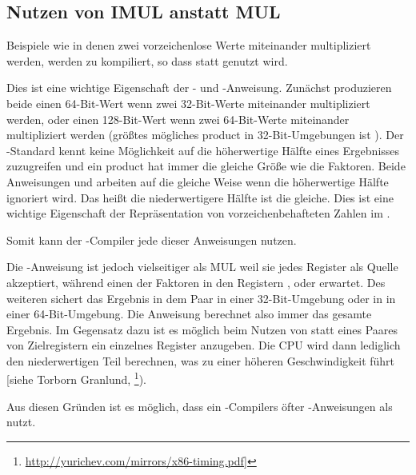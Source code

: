 \subsection{Nutzen von IMUL anstatt MUL}
\label{IMUL_over_MUL}

Beispiele wie  in denen zwei vorzeichenlose Werte miteinander multipliziert
werden, werden zu  kompiliert, so dass \IMUL statt \MUL genutzt wird.

Dies ist eine wichtige Eigenschaft der \MUL- und \IMUL-Anweisung.
Zunächst produzieren beide einen 64-Bit-Wert wenn zwei 32-Bit-Werte miteinander multipliziert werden,
oder einen 128-Bit-Wert wenn zwei 64-Bit-Werte miteinander multipliziert werden (größtes mögliches \gls{product}
in 32-Bit-Umgebungen ist ).
Der \CCpp-Standard kennt keine Möglichkeit auf die höherwertige Hälfte eines Ergebnisses zuzugreifen
und ein \gls{product} hat immer die gleiche Größe wie die Faktoren. %
Beide Anweisungen \MUL und \IMUL arbeiten auf die gleiche Weise wenn die höherwertige Hälfte ignoriert wird.
Das heißt die niederwertigere Hälfte ist die gleiche.
Dies ist eine wichtige Eigenschaft der Repräsentation von vorzeichenbehafteten Zahlen im .

Somit kann der \CCpp-Compiler jede dieser Anweisungen nutzen.

Die \IMUL-Anweisung ist jedoch vielseitiger als MUL weil sie jedes Register als Quelle akzeptiert,
während \MUL einen der Faktoren in den Registern \AX, \EAX oder \RAX erwartet.
Des weiteren sichert \MUL das Ergebnis in dem  Paar in einer 32-Bit-Umgebung oder
in  in einer 64-Bit-Umgebung. Die Anweisung berechnet also immer das gesamte Ergebnis.
Im Gegensatz dazu ist es möglich beim Nutzen von \IMUL statt eines Paares von Zielregistern ein
einzelnes Register anzugeben. Die \ac{CPU} wird dann lediglich den niederwertigen Teil berechnen,
was zu einer höheren Geschwindigkeit führt [siehe Torborn Granlund, \footnote{\url{http://yurichev.com/mirrors/x86-timing.pdf}]}).

Aus diesen Gründen ist es möglich, dass ein \CCpp-Compilers öfter \IMUL-Anweisungen als \MUL nutzt.

